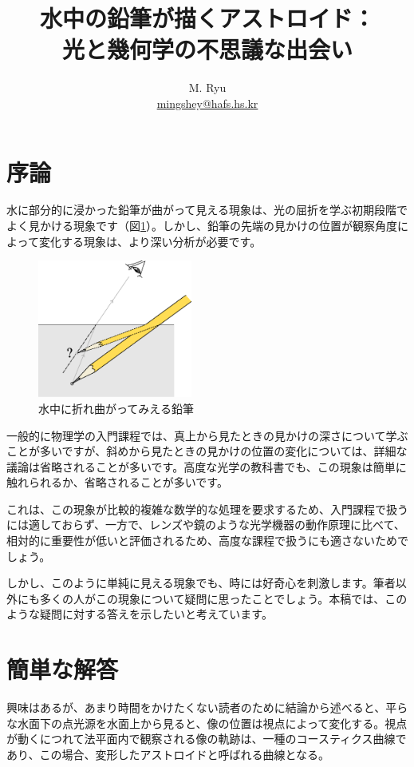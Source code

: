 \documentclass[twocolumn]{article}
\title{水中の鉛筆が描くアストロイド：\\光と幾何学の不思議な出会い}
\author{M. Ryu \\ {\href{mailto:mingshey@hafs.hs.kr}{mingshey@hafs.hs.kr}}}
\begin{document}
\maketitle
\section{序論}

水に部分的に浸かった鉛筆が曲がって見える現象は、光の屈折を学ぶ初期段階でよく見かける現象です（図\ref{fig:pencil}）。しかし、鉛筆の先端の見かけの位置が観察角度によって変化する現象は、より深い分析が必要です。

\begin{figure}[ht]
	\centering
	\includegraphics[width=2in]{figs/g164.eps}
	\caption{水中に折れ曲がってみえる鉛筆}
	\label{fig:pencil}
\end{figure}

一般的に物理学の入門課程では、真上から見たときの見かけの深さについて学ぶことが多いですが、斜めから見たときの見かけの位置の変化については、詳細な議論は省略されることが多いです。高度な光学の教科書でも、この現象は簡単に触れられるか、省略されることが多いです。

これは、この現象が比較的複雑な数学的な処理を要求するため、入門課程で扱うには適しておらず、一方で、レンズや鏡のような光学機器の動作原理に比べて、相対的に重要性が低いと評価されるため、高度な課程で扱うにも適さないためでしょう。

しかし、このように単純に見える現象でも、時には好奇心を刺激します。筆者以外にも多くの人がこの現象について疑問に思ったことでしょう。本稿では、このような疑問に対する答えを示したいと考えています。

\section{簡単な解答}

興味はあるが、あまり時間をかけたくない読者のために結論から述べると、平らな水面下の点光源を水面上から見ると、像の位置は視点によって変化する。視点が動くにつれて法平面内で観察される像の軌跡は、一種のコースティクス曲線であり、この場合、変形したアストロイドと呼ばれる曲線となる。
\end{document}
